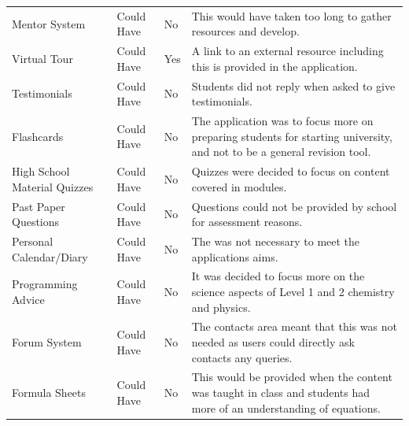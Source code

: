 \documentclass{l4proj}
\begin{document}
\begin{appendices}
\begin{table}[]
\begin{tabular}{ m{3cm}  m{2cm}  m{1.5cm}  m{17em} }
    Mentor System & Could Have & No & This would have taken too long to gather resources and develop. \\
    
    Virtual Tour & Could Have & Yes & A link to an external resource including this is provided in the application. \\
    
    Testimonials & Could Have & No & Students did not reply when asked to give testimonials. \\
    
    Flashcards & Could Have & No & The application was to focus more on preparing students for starting university,  and not to be a general revision tool. \\
    
    High School Material Quizzes & Could Have & No & Quizzes were decided to focus on content covered in modules. \\
    
    Past Paper Questions & Could Have & No & Questions could not be provided by school for assessment reasons. \\
    
    Personal Calendar/Diary  & Could Have & No & The was not necessary to meet the applications aims. \\
    
    Programming Advice & Could Have & No & It was decided to focus more on the science aspects of Level 1 and 2 chemistry and physics. \\
    
    Forum System & Could Have & No & The contacts area meant that this was not needed as users could directly ask contacts any queries. \\
    
    Formula Sheets & Could Have & No & This would be provided when the content was taught in class and students had more of an understanding of equations.

    \end{tabular}
\end{table}

\end{appendices}



\nocite{*}


\renewcommand{\thechapter}{0}

\end{document}

